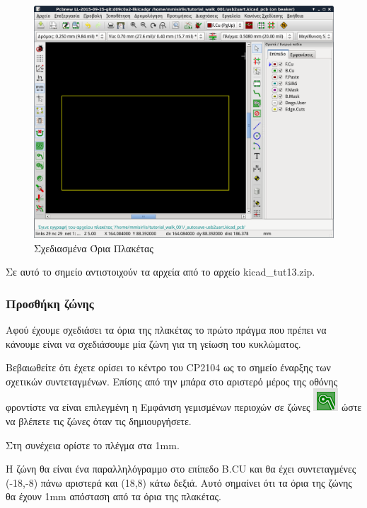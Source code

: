 \documentclass[a4paper]{article}
\begin{document}
\begin{figure}
  \begin{center}
    \includegraphics[width=.9\textwidth]{img/pcb-main-edges.png}
    \caption{Σχεδιασμένα Όρια Πλακέτας}
    \label{fig:pcb-main-edges}
  \end{center}
\end{figure}

Σε αυτό το σημείο αντιστοιχούν τα αρχεία από το αρχείο kicad\_tut13.zip.

\subsubsection{Προσθήκη ζώνης}
Αφού έχουμε σχεδιάσει τα όρια της πλακέτας το πρώτο πράγμα που πρέπει να κάνουμε είναι να σχεδιάσουμε μία ζώνη για τη γείωση του κυκλώματος. 

Βεβαιωθείτε ότι έχετε ορίσει το κέντρο του CP2104  ως το σημείο έναρξης των σχετικών συντεταγμένων. Επίσης από την μπάρα στο αριστερό μέρος της οθόνης φροντίστε να είναι επιλεγμένη η Εμφάνιση γεμισμένων περιοχών σε ζώνες \includegraphics[scale=.5]{img/pcb-ico-fullzones.png} ώστε να βλέπετε τις ζώνες όταν τις δημιουργήσετε.

Στη συνέχεια ορίστε το πλέγμα στα 1mm.

Η ζώνη θα είναι ένα παραλληλόγραμμο στο επίπεδο B.CU και θα έχει συντεταγμένες (-18,-8) πάνω αριστερά και (18,8) κάτω δεξιά. Αυτό σημαίνει ότι τα όρια της ζώνης θα έχουν 1mm απόσταση από τα όρια της πλακέτας.
\end{document}
